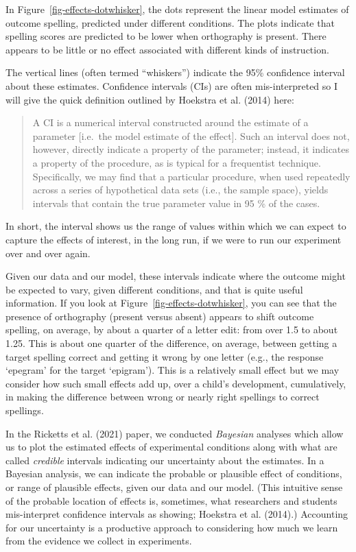 \documentclass[
  letterpaper,
  DIV=11,
  numbers=noendperiod]{scrreprt}
\begin{document}
In Figure~\ref{fig-effects-dotwhisker}, the dots represent the linear
model estimates of outcome spelling, predicted under different
conditions. The plots indicate that spelling scores are predicted to be
lower when orthography is present. There appears to be little or no
effect associated with different kinds of instruction.

The vertical lines (often termed ``whiskers'') indicate the 95\%
confidence interval about these estimates. Confidence intervals (CIs)
are often mis-interpreted so I will give the quick definition outlined
by Hoekstra et al. (2014) here:

\begin{quote}
A CI is a numerical interval constructed around the estimate of a
parameter {[}i.e.~the model estimate of the effect{]}. Such an interval
does not, however, directly indicate a property of the parameter;
instead, it indicates a property of the procedure, as is typical for a
frequentist technique. Specifically, we may find that a particular
procedure, when used repeatedly across a series of hypothetical data
sets (i.e., the sample space), yields intervals that contain the true
parameter value in 95 \% of the cases.
\end{quote}

In short, the interval shows us the range of values within which we can
expect to capture the effects of interest, in the long run, if we were
to run our experiment over and over again.

Given our data and our model, these intervals indicate where the outcome
might be expected to vary, given different conditions, and that is quite
useful information. If you look at Figure~\ref{fig-effects-dotwhisker},
you can see that the presence of orthography (present versus absent)
appears to shift outcome spelling, on average, by about a quarter of a
letter edit: from over 1.5 to about 1.25. This is about one quarter of
the difference, on average, between getting a target spelling correct
and getting it wrong by one letter (e.g., the response `epegram' for the
target `epigram'). This is a relatively small effect but we may consider
how such small effects add up, over a child's development, cumulatively,
in making the difference between wrong or nearly right spellings to
correct spellings.

In the Ricketts et al. (2021) paper, we conducted \emph{Bayesian}
analyses which allow us to plot the estimated effects of experimental
conditions along with what are called \emph{credible} intervals
indicating our uncertainty about the estimates. In a Bayesian analysis,
we can indicate the probable or plausible effect of conditions, or range
of plausible effects, given our data and our model. (This intuitive
sense of the probable location of effects is, sometimes, what
researchers and students mis-interpret confidence intervals as showing;
Hoekstra et al. (2014).) Accounting for our uncertainty is a productive
approach to considering how much we learn from the evidence we collect
in experiments.
\end{document}
